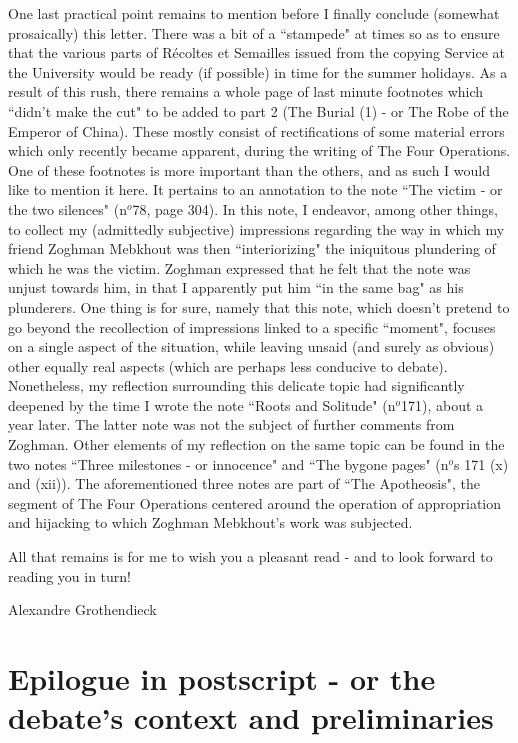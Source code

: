 One last practical point remains to mention before I finally conclude (somewhat prosaically) this letter. There was a bit of a ``stampede" at times so as to ensure that the various parts of R\'ecoltes et Semailles issued from the copying Service at the University would be ready (if possible) in time for the summer holidays. As a result of this rush, there remains a whole page of last minute footnotes which ``didn't make the cut" to be added to part 2 (The Burial (1) - or The Robe of the Emperor of China). These mostly consist of rectifications of some material errors which only recently became apparent, during the writing of The Four Operations. One of these footnotes is more important than the others, and as such I would like to mention it here. It pertains to an annotation to the note ``The victim - or the two silences" (n$^o$78, page 304). In this note, I endeavor, among other things, to collect my (admittedly subjective) impressions regarding the way in which my friend Zoghman Mebkhout was then ``interiorizing" the iniquitous plundering of which he was the victim. Zoghman expressed that he felt that the note was unjust towards him, in that I apparently put him ``in the same bag" as his plunderers. One thing is for sure, namely that this note, which doesn't pretend to go beyond the recollection of impressions linked to a specific ``moment", focuses on a single aspect of the situation, while leaving unsaid (and surely as obvious) other equally real aspects (which are perhaps less conducive to debate). Nonetheless, my reflection surrounding this delicate topic had significantly deepened by the time I wrote the note ``Roots and Solitude" (n$^o$171), about a year later. The latter note was not the subject of further comments from Zoghman. Other elements of my reflection on the same topic can be found in the two notes ``Three milestones - or innocence" and ``The bygone pages" (n$^o$s 171 (x) and (xii)). The aforementioned three notes are part of ``The Apotheosis", the segment of The Four Operations centered around the operation of appropriation and hijacking to which Zoghman Mebkhout's work was subjected.

All that remains is for me to wish you a pleasant read - and to look forward to reading you in turn!

\begin{flushright}
Alexandre Grothendieck
\end{flushright}



\section*{Epilogue in postscript - or the debate's context and preliminaries}

